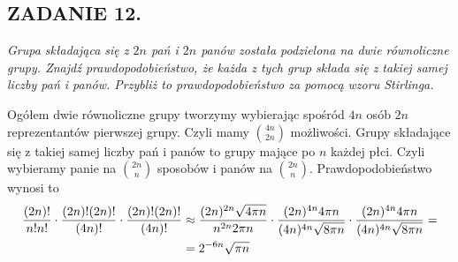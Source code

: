 \documentclass{article}
\begin{document}
\subsection*{ZADANIE 12.}
\emph{Grupa składająca się z $2n$ pań i $2n$ panów została podzielona na dwie równoliczne grupy. Znajdź prawdopodobieństwo, że każda z tych grup składa się z takiej samej liczby pań i panów. Przybliż to prawdopodobieństwo za pomocą wzoru Stirlinga.}
\medskip

Ogółem dwie równoliczne grupy tworzymy wybierając spośród $4n$ osób $2n$ reprezentantów pierwszej grupy. Czyli mamy ${4n\choose 2n}$ możliwości. Grupy składające się z takiej samej liczby pań i panów to grupy mające po $n$ każdej płci. Czyli wybieramy panie na ${2n\choose n}$ sposobów i panów na ${2n\choose n}$. Prawdopodobieństwo wynosi to 
\begin{align*}
    {(2n)!\over n!n!}\cdot{(2n)!(2n)!\over (4n)!}\cdot{(2n)!(2n)!\over(4n)!}&\approx{(2n)^{2n}\sqrt{4\pi n}\over n^{2n}2\pi n}\cdot{(2n)^{4n}4\pi n\over(4n)^{4n}\sqrt{8\pi n}}\cdot{(2n)^{4n}4\pi n\over(4n)^{4n}\sqrt{8\pi n}}=\\
    &={2^{-6n}\sqrt{\pi n}}
\end{align*}
\end{document}
